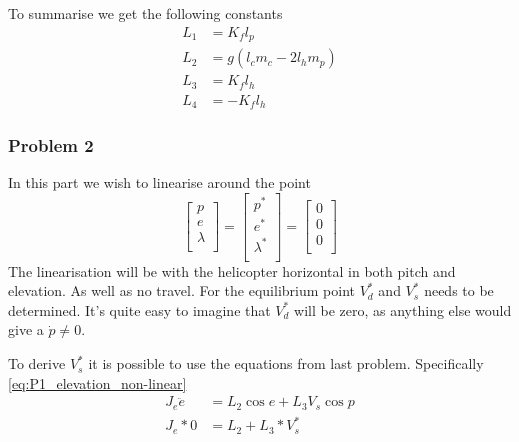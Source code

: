 To summarise we get the following constants
\begin{subequations}\label{eq:P1_constants_for_non-linear_eq}
    \begin{align}
        L_1 &= K_f l_p \label{eq:P1_L1} \\
        L_2 &= g (l_c m_c - 2 l_h m_p) \label{eq:P1_L2} \\
        L_3 &= K_f l_h \label{eq:P1_L3} \\
        L_4 &= -K_f l_h \label{eq:P1_L4}
    \end{align}
\end{subequations}

\subsubsection{Problem 2}
In this part we wish to linearise around the point
\begin{equation*}
    \begin{bmatrix}
        p \\
        e \\
        \lambda \\
    \end{bmatrix}
    =
    \begin{bmatrix}
        p^* \\
        e^* \\
        \lambda^* \\
    \end{bmatrix}
    =
    \begin{bmatrix}
        0 \\
        0 \\
        0 \\
    \end{bmatrix}
\end{equation*}
The linearisation will be with the helicopter horizontal in both pitch and elevation. As well as no travel. For the equilibrium point $V_d^*$ and $V_s^*$ needs to be determined. It's quite easy to imagine that $V_d^*$ will be zero, as anything else would give a $\dot{p} \neq 0$.

To derive $V_s^*$ it is possible to use the equations from last problem. Specifically \ref{eq:P1_elevation_non-linear}
\begin{align}
     J_e \ddot{e} &= L_2 \cos{e} + L_3 V_s \cos{p} \\
     J_e * 0 &= L_2 + L_3 * V_s^* \\
     
\end{align}

